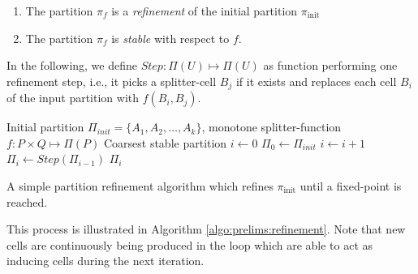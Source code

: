 		\begin{enumerate}
			\item The partition $\pi_f$ is a \textit{refinement} of the initial partition $\pi_{\mathrm{init}}$
			\item The partition $\pi_f$ is \textit{stable} with respect to $f$.
		\end{enumerate}
		
		In the following, we define $Step: \Pi(U) \mapsto \Pi(U)$ as function performing one refinement step, i.e., it picks a splitter-cell $B_j$ if it exists and replaces each cell $B_i$ of the input partition with $f(B_i, B_j)$.

		\begin{algorithm}[ht!]
			\centering
			\begin{algorithmic}
				\Require Initial partition $\Pi_{init} = \{ A_1, A_2, \ldots, A_k \}$, monotone splitter-function $f: P \times Q \mapsto \Pi(P)$
				\Ensure Coarsest stable partition
				\Statex
					\State $i \gets 0$
					\State $\Pi_0 \gets \Pi_{init}$
					\Repeat
						\State $i \gets i + 1$
						\State $\Pi_i \gets Step(\Pi_{i-1})$
					\State \Return $\Pi_i$
				\EndFunction
			\end{algorithmic}
			\caption{A simple partition refinement algorithm which refines $\pi_{\mathrm{init}}$ until a fixed-point is reached.}
			\label{algo:prelims:refinement}
		\end{algorithm}
		
%		
%		
%		
%		

		
		This process is illustrated in Algorithm \ref{algo:prelims:refinement}. Note that new cells are continuously being produced in the loop which are able to act as inducing cells during the next iteration.
		
